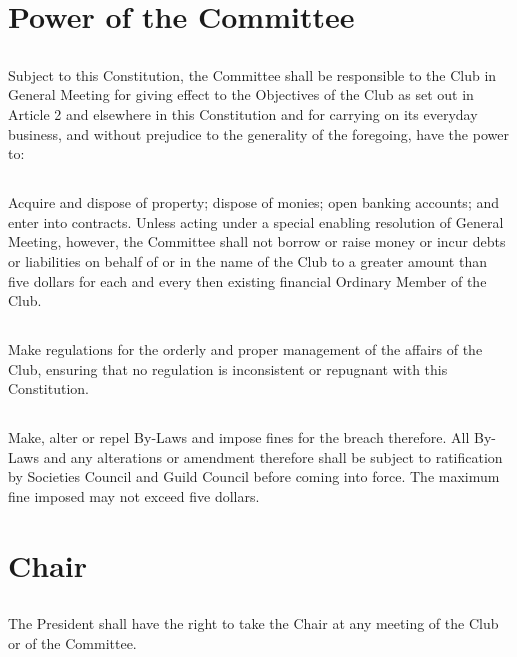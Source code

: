\documentclass[10.5pt]{article}
\begin{document}
\section{Power of the Committee}
\subsection{} Subject to this Constitution, the Committee shall be responsible to the Club in General Meeting for giving effect to the Objectives of the Club as set out in Article 2 and elsewhere in this Constitution and for carrying on its everyday business, and without prejudice to the generality of
the foregoing, have the power to:
\subsection{} Acquire and dispose of property; dispose of monies; open banking accounts; and enter into contracts. Unless acting under a special enabling resolution of General Meeting, however, the Committee shall not borrow or raise money or incur debts or liabilities on behalf of or in the name of the Club to a greater amount than five dollars for each and every then existing financial Ordinary Member of the Club.
\subsection{} Make regulations for the orderly and proper management of the affairs of the Club, ensuring that no regulation is inconsistent or repugnant with this Constitution.
\subsection{} Make, alter or repel By-Laws and impose fines for the breach therefore. All By-Laws and any
alterations or amendment therefore shall be subject to ratification by Societies Council and Guild Council before coming into force. The maximum fine imposed may not exceed five dollars.
\newline


\section{Chair}
\subsection{} The President shall have the right to take the Chair at any meeting of the Club or of the
Committee.
\end{document}
